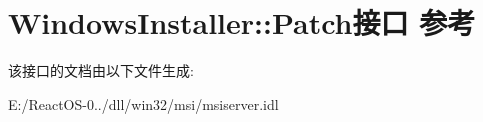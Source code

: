 \hypertarget{interface_windows_installer_1_1_patch}{}\section{Windows\+Installer\+:\+:Patch接口 参考}
\label{interface_windows_installer_1_1_patch}


该接口的文档由以下文件生成\+:\begin{DoxyCompactItemize}
\item 
E\+:/\+React\+O\+S-\/0../dll/win32/msi/msiserver.\+idl\end{DoxyCompactItemize}
